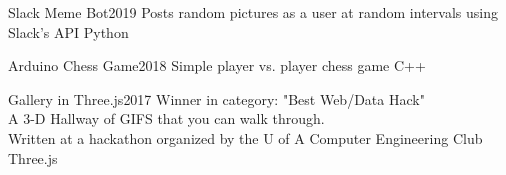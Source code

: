 
\begin{projects}
    \project
    {Slack Meme Bot}{2019}
    {}
    {Posts random pictures as a user at random intervals using Slack's API}
    {Python}

    \project
    {Arduino Chess Game}{2018}
    {}
    {Simple player vs. player chess game}
    {C++}

	\project
	{Gallery in Three.js}{2017}
	{}
	{
            Winner in category: "Best Web/Data Hack"\\
            A 3-D Hallway of GIFS that you can walk through.\\
            Written at a hackathon organized by the U of A Computer Engineering Club 
    }
    {Three.js}
				

\end{projects}
